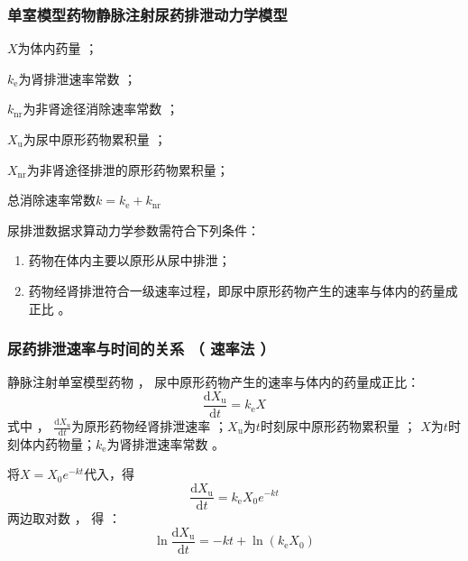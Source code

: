 \documentclass[dvipsnames, svgnames, x11names]{beamer}
\begin{document}
\begin{frame}
    \frametitle{单室模型药物静脉注射尿药排泄动力学模型}
    \begin{minipage}{0.48\linewidth}
        \begin{center}
        \end{center}
    \end{minipage}\hfill
    \begin{minipage}{0.48\linewidth}
        $X$为体内药量 ；

        $k_\mathrm{e}$为肾排泄速率常数 ；
        
        $k_{\mathrm{nr}}$为非肾途径消除速率常数 ；
        
        $X_\mathrm{u}$为尿中原形药物累积量 ；
        
        $X_{\mathrm{nr}}$为非肾途径排泄的原形药物累积量；

        总消除速率常数$k= k_\mathrm{e} + k_{\mathrm{nr}}$
    \end{minipage}

    \smallskip
    尿排泄数据求算动力学参数需符合下列条件：
    \begin{enumerate}
      \item 药物在体内主要以原形从尿中排泄；
      \item 药物经肾排泄符合一级速率过程，即尿中原形药物产生的速率与体内的药量成正比 。
    \end{enumerate}
\end{frame}


\begin{frame}
    \frametitle{尿药排泄速率与时间的关系 （ 速率法 ）}
    静脉注射单室模型药物 ， 尿中原形药物产生的速率与体内的药量成正比：
    \[
        \frac{\mathrm{d}X_{\mathrm{u}}}{\mathrm{d}t}=k_{\mathrm{e}}X
    \]
    式中 ， $\frac{\mathrm{d}X_{\mathrm{u}}}{\mathrm{d}t}$为原形药物经肾排泄速率 ；$X_{\mathrm{u}}$为$t$时刻尿中原形药物累积量 ； $X$为$t$时刻体内药物量；$k_{\mathrm{e}}$为肾排泄速率常数 。

    将$X = X_0e^{-kt}$代入，得
    \[
        \frac{\mathrm{d}X_{\mathrm{u}}}{\mathrm{d}t}=k_{\mathrm{e}}X_0e^{-kt}
    \]
    两边取对数 ， 得 ：
    \[
        \ln\frac{\mathrm{d}X_{\mathrm{u}}}{\mathrm{d}t}=-kt+\ln(k_\mathrm{e}X_0)
    \]
\end{frame}
\end{document}
